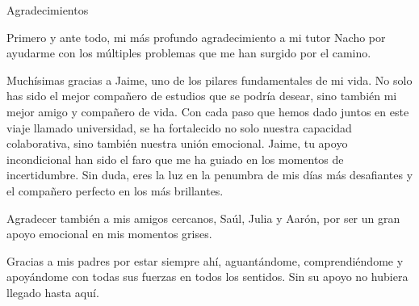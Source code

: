 \newpage
\thispagestyle{empty}

{ \flushright

\begin{LARGE}
Agradecimientos
\end{LARGE}

\hspace{3mm}

\begin{large}
Primero y ante todo, mi más profundo agradecimiento a mi tutor Nacho por ayudarme con los múltiples problemas que me han surgido por el camino.

\bigskip

Muchísimas gracias a Jaime, uno de los pilares fundamentales de mi vida. No solo has sido el mejor compañero de estudios que se podría desear, sino también mi mejor amigo y compañero de vida. Con cada paso que hemos dado juntos en este viaje llamado universidad, se ha fortalecido no solo nuestra capacidad colaborativa, sino también nuestra unión emocional. Jaime, tu apoyo incondicional han sido el faro que me ha guiado en los momentos de incertidumbre. Sin duda, eres la luz en la penumbra de mis días más desafiantes y el compañero perfecto en los más brillantes.

\bigskip

Agradecer también a mis amigos cercanos, Saúl, Julia y Aarón, por ser un gran apoyo emocional en mis momentos grises.

\bigskip

Gracias a mis padres por estar siempre ahí, aguantándome, comprendiéndome y apoyándome con todas sus fuerzas en todos los sentidos. Sin su apoyo no hubiera llegado hasta aquí.

\par

\end{large}

}
